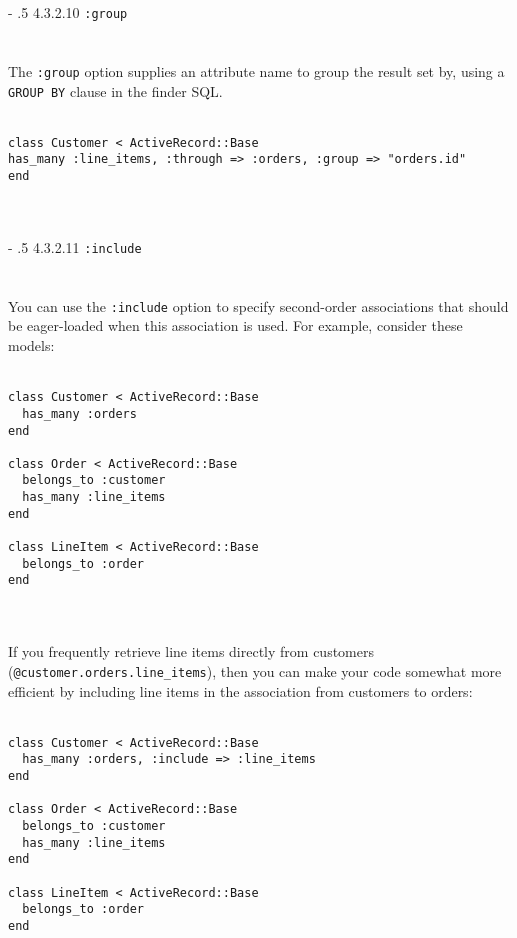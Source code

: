 \documentclass[10pt]{book}
\makeatletter
\renewcommand\paragraph{%
   \@startsection{paragraph}{4}{0mm}%
      {-\baselineskip}%
      {.5\baselineskip}%
      {\normalfont\scriptsize\bfseries}}
\makeatother
\begin{document}
\paragraph{4.3.2.10 \texttt{:group}}\\ \\\\

The \texttt{:group} option supplies an attribute name to group the result set by, using a \texttt{GROUP BY} clause in the finder SQL.
\\ \\
\begin{minipage}{\textwidth}{\scriptsize
\begin{verbatim}
class Customer < ActiveRecord::Base
has_many :line_items, :through => :orders, :group => "orders.id"
end
\end{verbatim}}
\end{minipage}
\\ \\

\paragraph{4.3.2.11 \texttt{:include}}\\ \\\\

You can use the \texttt{:include} option to specify second-order  associations that should be eager-loaded when this association is used.  For example, consider these models:
\\ \\
\begin{minipage}{\textwidth}{\scriptsize
\begin{verbatim}
class Customer < ActiveRecord::Base
  has_many :orders
end
 
class Order < ActiveRecord::Base
  belongs_to :customer
  has_many :line_items
end
 
class LineItem < ActiveRecord::Base
  belongs_to :order
end
\end{verbatim}}
\end{minipage}
\\ \\

If you frequently retrieve line items directly from customers (\texttt{@customer.orders.line\_items}), then you can make your code somewhat more efficient by including line items in the association from customers to orders:
\\ \\
\begin{minipage}{\textwidth}{\scriptsize
\begin{verbatim}
class Customer < ActiveRecord::Base
  has_many :orders, :include => :line_items
end
 
class Order < ActiveRecord::Base
  belongs_to :customer
  has_many :line_items
end
 
class LineItem < ActiveRecord::Base
  belongs_to :order
end
\end{verbatim}}
\end{minipage}
\\ \\
\end{document}
